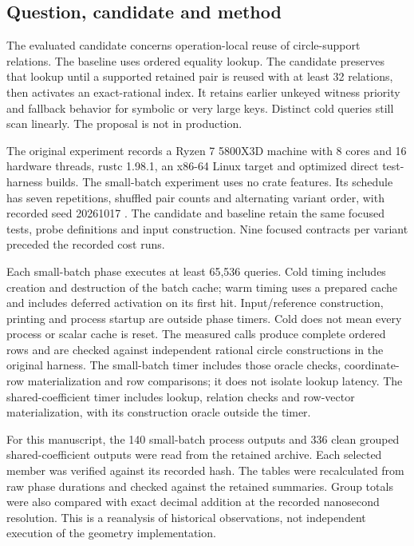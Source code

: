 \documentclass[11pt]{article}
\begin{document}
\subsection{Question, candidate and method}
The evaluated candidate concerns operation-local reuse of circle-support
relations. The baseline uses ordered equality lookup. The candidate preserves
that lookup until a supported retained pair is reused with at least 32
relations, then activates an exact-rational index. It retains earlier unkeyed
witness priority and fallback behavior for symbolic or very large keys.
Distinct cold queries still scan linearly. The proposal is not in production.

The original experiment records a Ryzen 7 5800X3D machine with 8 cores and
16 hardware threads, rustc 1.98.1, an x86-64 Linux target and optimized direct
test-harness builds. The small-batch experiment uses no crate features.
Its schedule has seven repetitions, shuffled pair counts and alternating
variant order, with recorded seed 20261017 \cite{e46}. The candidate and baseline
retain the same focused tests, probe definitions and input construction.
Nine focused contracts per variant preceded the recorded cost runs.

Each small-batch phase executes at least 65,536 queries. Cold timing includes
creation and destruction of the batch cache; warm timing uses a prepared cache
and includes deferred activation on its first hit. Input/reference construction,
printing and process startup are outside phase timers. Cold does not mean every
process or scalar cache is reset. The measured calls produce complete ordered
rows and are checked against independent rational circle constructions in the
original harness. The small-batch timer includes those oracle checks,
coordinate-row materialization and row comparisons; it does not isolate lookup
latency. The shared-coefficient timer includes lookup, relation checks and
row-vector materialization, with its construction oracle outside the timer.

For this manuscript, the 140 small-batch process outputs and 336 clean grouped
shared-coefficient outputs were read from the retained archive. Each selected
member was verified against its recorded hash. The tables were recalculated
from raw phase durations and checked against the retained summaries. Group
totals were also compared with exact decimal addition at the recorded
nanosecond resolution. This is a reanalysis of historical observations, not
independent execution of the geometry implementation.
\end{document}
